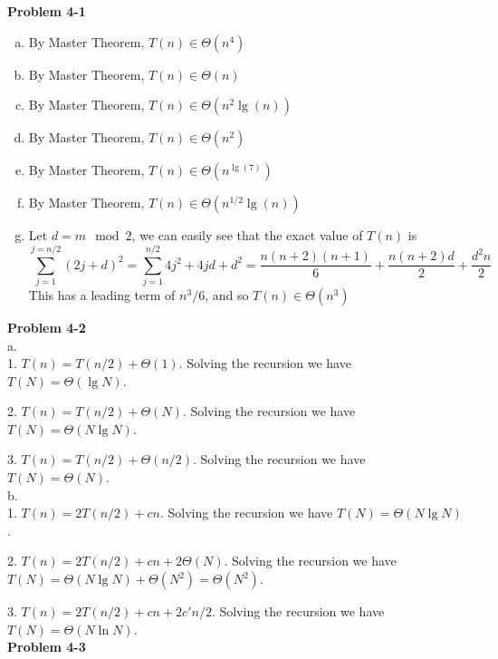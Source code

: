\documentclass{article}
\begin{document}
\noindent\textbf{Problem 4-1}\\

\begin{enumerate}[a)]
\item
By Master Theorem, $T(n) \in \Theta(n^4)$

\item
By Master Theorem, $T(n) \in \Theta(n)$

\item
By Master Theorem, $T(n) \in \Theta(n^2\lg(n))$

\item
By Master Theorem, $T(n) \in \Theta(n^2)$

\item
By Master Theorem, $T(n) \in \Theta(n^{\lg(7)})$

\item
By Master Theorem, $T(n) \in \Theta(n^{1/2}\lg(n))$

\item
Let $d = m\mod 2$, we can easily see that the exact value of $T(n)$ is
\[
\sum_{j=1}^{j=n/2} (2j+d)^2 = \sum_{j=1}^{n/2}4j^2 + 4jd + d^2 = \frac{n(n+2)(n+1)}{6} + \frac{n(n+2)d}{2} + \frac{d^2n}{2}
\]
This has a leading term of $n^3/6$, and so $T(n) \in \Theta(n^3)$

\end{enumerate}

\noindent\textbf{Problem 4-2}\\

a. \\

1. $T(n) = T(n/2) + \Theta(1)$.  Solving the recursion we have $T(N) = \Theta(\lg N)$.

2. $T(n) = T(n/2) + \Theta(N)$.  Solving the recursion we have $T(N) = \Theta(N \lg N)$.

3. $T(n) = T(n/2) + \Theta(n/2)$. Solving the recursion we have $T(N) = \Theta(N)$. \\

b.\\

  1. $T(n) = 2T(n/2) + cn$. Solving the recursion we have $T(N) = \Theta(N\lg N)$.

2. $T(n) = 2T(n/2) + cn + 2\Theta(N)$.  Solving the recursion we have $T(N) = \Theta(N\lg N) + \Theta(N^2) = \Theta(N^2)$.

3. $T(n) = 2T(n/2) + cn + 2c'n/2$.  Solving the recursion we have $T(N) = \Theta(N\ln N)$. \\

\noindent\textbf{Problem 4-3}\\
\end{document}
